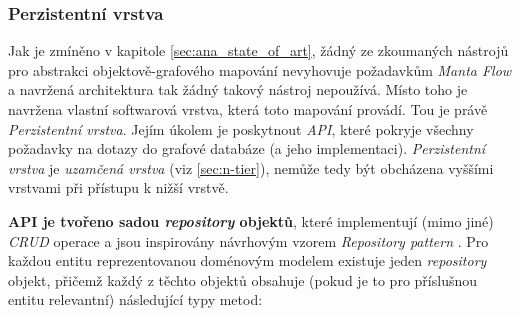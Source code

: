 \subsubsection{Perzistentní vrstva}
\label{sec:des_persistence}
Jak je zmíněno v kapitole \ref{sec:ana_state_of_art}, žádný ze zkoumaných nástrojů pro abstrakci objektově-grafového mapování nevyhovuje požadavkům \textit{Manta Flow} a navržená architektura tak žádný takový nástroj nepoužívá. Místo toho je navržena vlastní softwarová vrstva, která toto mapování provádí. Tou je právě \textit{Perzistentní vrstva}. Jejím úkolem je poskytnout \textit{API}, které pokryje všechny požadavky na dotazy do grafové databáze (a jeho implementaci). \textit{Perzistentní vrstva} je \textit{uzamčená vrstva} (viz \ref{sec:n-tier}), nemůže tedy být obcházena vyššími vrstvami při přístupu k nižší vrstvě.

\textbf{API je tvořeno sadou \textit{repository} objektů}, které implementují (mimo jiné) \textit{CRUD} operace a jsou inspirovány návrhovým vzorem \textit{Repository pattern} \cite{Dorfmann16}. Pro každou entitu reprezentovanou doménovým modelem existuje jeden \textit{repository} objekt, přičemž každý z těchto objektů obsahuje (pokud je to pro příslušnou entitu relevantní) následující typy metod:

